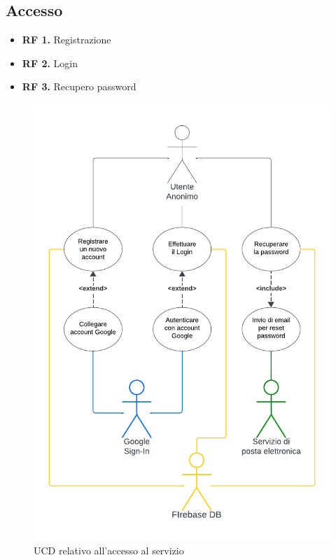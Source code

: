 \documentclass[11pt, a4paper]{article}
\theoremstyle{definition} %
\begin{document}
\subsection{Accesso}
\begin{itemize}
    \item \textbf{RF 1.} Registrazione
    \item \textbf{RF 2.} Login
    \item \textbf{RF 3.} Recupero password
\end{itemize}
\begin{figure}[H]
\centering
\includegraphics[scale=0.7]{materiale/ucdiagrams/ucaccesso.pdf}
\caption{UCD relativo all'accesso al servizio}
\end{figure}
\end{document}
